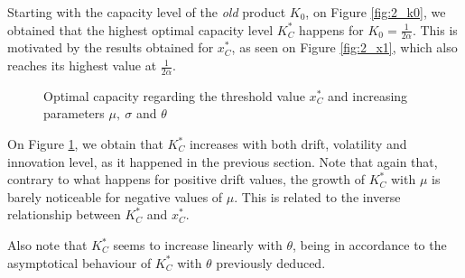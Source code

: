 Starting with the capacity level of the \textit{old} product $K_0$, on Figure \ref{fig:2_k0}, we obtained that the highest optimal capacity level $K^*_C$ happens for $K_0=\frac{1}{2 \alpha}$. This is motivated by the results obtained for $x^*_C$, as seen on Figure \ref{fig:2_x1}, which also reaches its highest value at $\frac{1}{2 \alpha}$.


\begin{figure}[!htb]
	\begin{subfigmatrix}{3}
	\end{subfigmatrix}
	\caption{Optimal capacity regarding the threshold value $x^*_C$ and increasing parameters $\mu, \ \sigma$ and $\theta$}
	\label{fig:2_k1}
\end{figure}

On Figure \ref{fig:2_k1}, we obtain that $K^*_C$ increases with both drift, volatility and innovation level, as it happened in the previous section. Note that again that, contrary to what happens for positive drift values, the growth of $K^*_C$ with $\mu$ is barely noticeable for negative values of $\mu$. This is related to the inverse relationship between $K^*_C$ and $x_C^*$.


Also note that $K^*_C$ seems to increase linearly with $\theta$, being in accordance to the asymptotical behaviour of $K_C^*$ with $\theta$ previously deduced.

